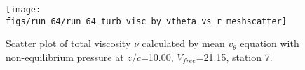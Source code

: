 \begin{figure}[H]
\centering
\texttt{[image: figs/run\_64/run\_64\_turb\_visc\_by\_vtheta\_vs\_r\_meshscatter]}
\caption{Scatter plot of total viscosity $\nu$ calculated by mean $\bar{v}_{\theta}$ equation with non-equilibrium pressure at $z/c$=10.00, $V_{free}$=21.15, station 7.}
\label{fig:run_64_turb_visc_by_vtheta_vs_r_meshscatter}
\end{figure}


